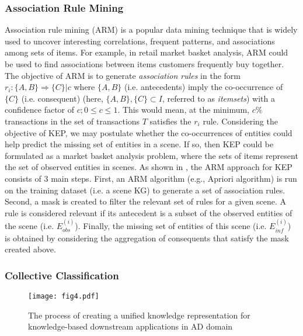 \documentclass[conference]{IEEEtran}
\begin{document}
\subsubsection{\textbf{Association Rule Mining}}
Association rule mining (ARM) is a popular data mining technique that is widely used to uncover interesting correlations, frequent patterns, and associations among sets of items. For example, in retail market basket analysis, ARM could be used to find associations between items customers frequently buy together. The objective of ARM is to generate \textit{association rules} in the form  $r_i: \{A, B\} \Rightarrow {\{C\}} | c$ where $\{A,B\}$ (i.e. antecedents) imply the co-occurrence of $\{C\}$ (i.e. consequent) (here, $ \{A, B\},  \{C\} \subset I$, referred to as \textit{itemsets}) with a confidence factor of $c;  0 \leq c \leq 1$. This would mean, at the minimum, $c\%$ transactions in the set of transactions $T$ satisfies the $r_i$ rule. Considering the objective of KEP, we may postulate whether the co-occurrences of entities could help predict the missing set of entities in a scene. If so, then KEP could be formulated as a market basket analysis problem, where the sets of items represent the set of observed entities in scenes. As shown in \cite{wickramarachchi2021knowledge}, the ARM approach for KEP consists of 3 main steps. First, an ARM algorithm (e.g., Apriori algorithm\cite{agrawalMSTV96}) is run on the training dataset (i.e. a scene KG) to generate a set of association rules. Second, a mask is created to filter the relevant set of rules for a given scene. A rule is considered relevant if its antecedent is a subset of the observed entities of the scene  (i.e. $E^{(i)}_{obs}$). Finally, the missing set of entities of this scene (i.e. $E^{(i)}_{inf}$) is obtained by considering the aggregation of consequents that satisfy the mask created above.\\ 

\subsubsection{\textbf{Collective Classification}}

\begin{figure*}[ht]
    \centering
    \texttt{[image: fig4.pdf]}
    \caption{The process of creating a unified knowledge representation for knowledge-based downstream applications in AD domain}
    \label{fig:DSKG}
\end{figure*}
\end{document}
